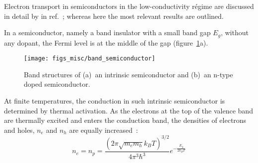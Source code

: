 Electron transport in semiconductors in the low-conductivity r\'egime are discussed in detail by \citeauthor{schklovskii_efros} in ref.~\cite{schklovskii_efros}; whereas here the most relevant results are outlined.

In a semiconductor, namely a band insulator with a small band gap $E_g$, without any dopant, the Fermi level is at the middle of the gap (figure~\ref{fig:band_semiconductor}a). %
\begin{figure}[ht]%
    \centering%
    \texttt{[image: figs\_misc/band\_semiconductor]}%
    \caption[Band structures of an intrinsic semiconductor and an n-type doped semiconductor]{\label{fig:band_semiconductor}Band structures of (a)~an intrinsic semiconductor and (b)~an n-type doped semiconductor.}%
\end{figure}%
%
At finite temperatures, the conduction in such intrinsic semiconductor is determined by thermal activation. As the electrons at the top of the valence band are thermally excited and enters the conduction band, the densities of electrons and holes, $n_e$ and $n_h$ are equally increased~\cite[section 4.1]{schklovskii_efros}:%
\begin{equation}
    n_e = n_p = \frac{\left(2\pi\sqrt{m_e m_h}k_B T\right)^{3/2}}{4\pi^3\hbar^3}e^{-\frac{E_g}{2 k_B T}}
\end{equation}%